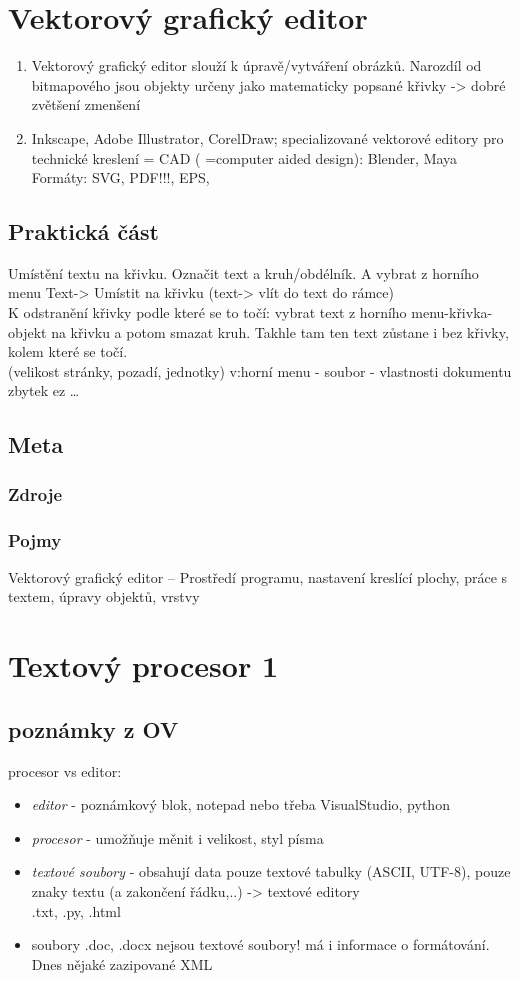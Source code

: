 \documentclass[12pt]{article}
\begin{document}
\section{Vektorový grafický editor}
\begin{enumerate}
\item Vektorový grafický editor slouží k úpravě/vytváření obrázků. Narozdíl od bitmapového jsou objekty určeny jako matematicky popsané křivky -> dobré zvětšení zmenšení
\item Inkscape, Adobe Illustrator,  CorelDraw; specializované vektorové editory pro technické kreslení = CAD ( =computer aided design): Blender, Maya\\
Formáty: SVG, PDF!!!, EPS, 
\end{enumerate}
\subsection{Praktická část}
Umístění textu na křivku. Označit text a kruh/obdélník. A vybrat z horního menu Text-> Umístit na křivku (text-> vlít do text do rámce)\\
K odstranění křivky podle které se to točí: vybrat text z horního menu-křivka-objekt na křivku a potom smazat kruh. Takhle tam ten text zůstane i bez křivky, kolem které se točí.\\
(velikost stránky, pozadí, jednotky) v:horní menu - soubor - vlastnosti dokumentu\\
zbytek ez \dots
\subsection{Meta}
\subsubsection{Zdroje}
\subsubsection{Pojmy}
Vektorový grafický editor – Prostředí programu, nastavení kreslící plochy, práce s textem, úpravy objektů, vrstvy

\section{Textový procesor 1}
\subsection{poznámky z OV}
procesor vs editor:
\begin{itemize}
\item \emph{editor} - poznámkový blok, notepad nebo třeba VisualStudio, python
\item \emph{procesor} - umožňuje měnit i velikost, styl písma
\item \emph{textové soubory} - obsahují data pouze textové tabulky (ASCII, UTF-8), pouze znaky textu (a zakončení řádku,..) -> textové editory\\
.txt, .py, .html
\item soubory .doc, .docx nejsou textové soubory! má i informace o formátování. Dnes nějaké zazipované XML
\end{itemize}
\end{document}
